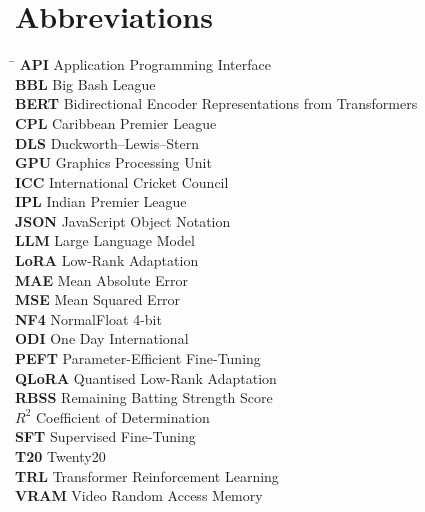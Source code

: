 \chapter*{Abbreviations}

\begin{tabbing}
\hspace{3.5cm} \= \kill
\textbf{API}   \> Application Programming Interface \\[4pt]
\textbf{BBL}   \> Big Bash League \\[4pt]
\textbf{BERT}  \> Bidirectional Encoder Representations from Transformers \\[4pt]
\textbf{CPL}   \> Caribbean Premier League \\[4pt]
\textbf{DLS}   \> Duckworth--Lewis--Stern \\[4pt]
\textbf{GPU}   \> Graphics Processing Unit \\[4pt]
\textbf{ICC}   \> International Cricket Council \\[4pt]
\textbf{IPL}   \> Indian Premier League \\[4pt]
\textbf{JSON}  \> JavaScript Object Notation \\[4pt]
\textbf{LLM}   \> Large Language Model \\[4pt]
\textbf{LoRA}  \> Low-Rank Adaptation \\[4pt]
\textbf{MAE}   \> Mean Absolute Error \\[4pt]
\textbf{MSE}   \> Mean Squared Error \\[4pt]
\textbf{NF4}   \> NormalFloat 4-bit \\[4pt]
\textbf{ODI}   \> One Day International \\[4pt]
\textbf{PEFT}  \> Parameter-Efficient Fine-Tuning \\[4pt]
\textbf{QLoRA} \> Quantised Low-Rank Adaptation \\[4pt]
\textbf{RBSS}  \> Remaining Batting Strength Score \\[4pt]
\textbf{$R^2$} \> Coefficient of Determination \\[4pt]
\textbf{SFT}   \> Supervised Fine-Tuning \\[4pt]
\textbf{T20}   \> Twenty20 \\[4pt]
\textbf{TRL}   \> Transformer Reinforcement Learning \\[4pt]
\textbf{VRAM}  \> Video Random Access Memory \\
\end{tabbing}
